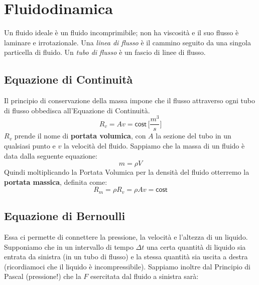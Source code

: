 \chapter{Fluidodinamica}
Un fluido ideale è un fluido incomprimibile; non ha viscosità e il suo flusso è
laminare e irrotazionale. Una \textit{linea di flusso} è il cammino seguito da 
una singola particella di fluido. Un \textit{tubo di flusso} è un fascio di 
linee di flusso.

    \section{Equazione di Continuità} Il principio di conservazione della massa
    impone che il flusso attraverso ogni tubo di flusso obbedisca all'Equazione
    di Continuità.
        \begin{equation}
            R_v = Av = \textsf{cost} \, \Bigg[\frac{m^3}{s}\Bigg]
        \end{equation}
    $R_v$ prende il nome di \textbf{portata volumica}, con $A$ la sezione del 
    tubo in un qualsiasi punto e $v$ la velocità del fluido.
    Sappiamo che la massa di un fluido è data dalla seguente equazione:
        \begin{equation*}
            m = \rho V
        \end{equation*}
    Quindi moltiplicando la Portata Volumica per la densità del fluido 
    otterremo la \textbf{portata massica}, definita come:
        \begin{equation}
            R_m = \rho R_v = \rho A v = \textsf{cost}
        \end{equation}

    \section{Equazione di Bernoulli} Essa ci permette di connettere la 
    pressione, la velocità e l'altezza di un liquido. Supponiamo che in un 
    intervallo di tempo $\Delta t$ una certa quantità di liquido sia entrata da
    sinistra (in un tubo di flusso) e la stessa quantità sia uscita a destra 
    (ricordiamoci che il liquido è incompressibile). Sappiamo inoltre dal 
    Principio di Pascal (pressione!) che la $F$ esercitata dal fluido a 
    sinistra sarà:
